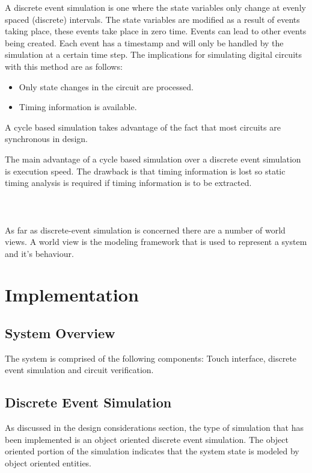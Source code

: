\documentclass[twoside]{uva-inf-bachelor-thesis}
\begin{document}
A discrete event simulation is one where the state variables only change at evenly spaced (discrete) intervals. The state variables are modified as a result of events taking place, these events take place in zero time. Events can lead to other events being created. Each event has a timestamp and will only be handled by the simulation at a certain time step. The implications for simulating digital circuits with this method are as follows:
\begin{itemize}
  \item Only state changes in the circuit are processed.
  \item Timing information is available.
\end{itemize}

A cycle based simulation takes advantage of the fact that most circuits are synchronous in design. 

The main advantage of a cycle based simulation over a discrete event simulation is execution speed. The drawback is that timing information is lost so static timing analysis is required if timing information is to be extracted.
\\
\\
\\
\\

As far as discrete-event simulation is concerned there are a number of world views.  A world view is the modeling framework that is used to represent a system and it's behaviour.

\chapter{Implementation}
\section{System Overview}
The system is comprised of the following components: Touch interface, discrete event simulation and circuit verification.


\section{Discrete Event Simulation}
As discussed in the design considerations section, the type of simulation that has been implemented is an object oriented discrete event simulation. The object oriented portion of the simulation indicates that the system state is modeled by object oriented entities.
\end{document}
